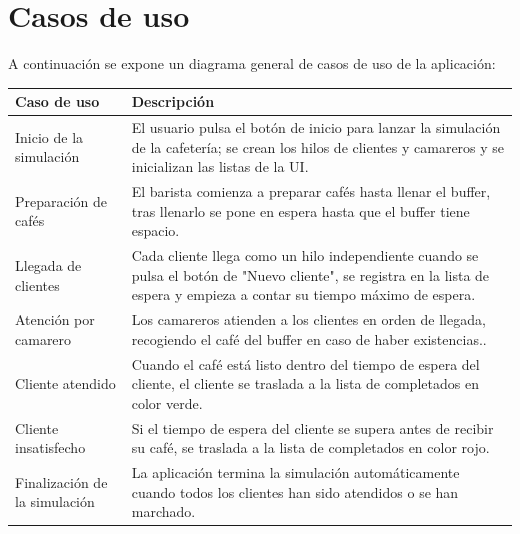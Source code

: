 \documentclass[a4paper,12pt]{article}
\begin{document}
    \section{Casos de uso}
    A continuación se expone un diagrama general de casos de uso de la aplicación:
    \begin{center}
    \begin{tabularx}{0.8\textwidth}{|X|X|}
        \hline
        \textbf{Caso de uso} & \textbf{Descripción} \\
        \hline
        Inicio de la simulación & El usuario pulsa el botón de inicio para lanzar la simulación de la cafetería; se crean los hilos de clientes y camareros y se inicializan las listas de la UI. \\            
        \hline
        Preparación de cafés & El barista comienza a preparar cafés hasta llenar el buffer, tras llenarlo se pone en espera hasta que el buffer tiene espacio. \\
        \hline
        Llegada de clientes & Cada cliente llega como un hilo independiente cuando se pulsa el botón de "Nuevo cliente", se registra en la lista de espera y empieza a contar su tiempo máximo de espera. \\
        \hline
        Atención por camarero & Los camareros atienden a los clientes en orden de llegada, recogiendo el café del buffer en caso de haber existencias.. \\
        \hline
        Cliente atendido & Cuando el café está listo dentro del tiempo de espera del cliente, el cliente se traslada a la lista de completados en color verde. \\
        \hline
        Cliente insatisfecho & Si el tiempo de espera del cliente se supera antes de recibir su café, se traslada a la lista de completados en color rojo. \\
        \hline
        Finalización de la simulación & La aplicación termina la simulación automáticamente cuando todos los clientes han sido atendidos o se han marchado. \\
        \hline  
    \end{tabularx}
    \end{center}
\end{document}
